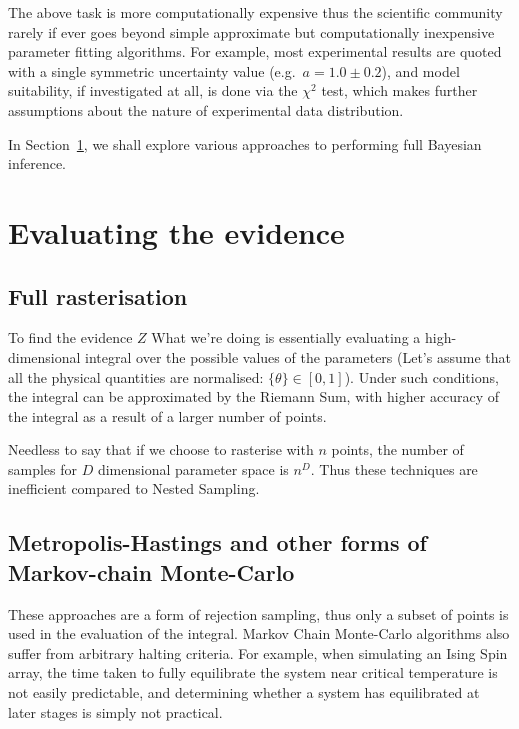 \documentclass[12pt]{article}
\begin{document}
The above task is more computationally expensive thus the scientific
community rarely if ever goes beyond simple approximate but
computationally inexpensive parameter fitting algorithms. For example,
most experimental results are quoted with a single symmetric
uncertainty value (e.g.~\(a = 1.0 \pm 0.2 \)), and model suitability,
if investigated at all, is done via the \( \chi^2 \)
test\autocite{Pearson1900}, which makes further assumptions about the
nature of experimental data distribution.

In Section~\ref{sec-3}, we shall explore various approaches to
performing full Bayesian inference.

\section{Evaluating the evidence}\label{sec-3}

\subsection{Full rasterisation}\label{sec-3-1}

To find the evidence \( Z \) What we're doing is essentially
evaluating a high-dimensional integral over the possible values of the
parameters (Let's assume that all the physical quantities are
normalised: \( \lbrace \theta \rbrace \in [0, 1] \)). Under such conditions, the integral
can be approximated by the Riemann Sum, with higher accuracy of the
integral as a result of a larger number of
points.

Needless to say that if we choose to rasterise with \( n \) points,
the number of samples for \(D \) dimensional parameter space is
\( n^{D} \). Thus these techniques are inefficient compared to Nested Sampling\autocite{polychord}.

\subsection{Metropolis-Hastings and other forms of Markov-chain Monte-Carlo}\label{sec-3-2}

These approaches are a form of rejection sampling, thus only a subset
of points is used in the evaluation of the integral. Markov Chain
Monte-Carlo algorithms also suffer from arbitrary halting
criteria\autocite{Metropolis,Metropolis-hastings-gibbs}. For
example, when simulating an Ising Spin array, the time taken to fully
equilibrate the system near critical temperature is not easily
predictable, and determining whether a system has equilibrated at
later stages is simply not practical.\autocite{me-ising}
\end{document}
